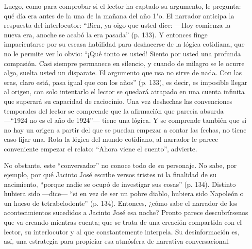 \documentclass[14pt,twoside,final]{extbook} %
\begin{document}
Luego, como para comprobar si el lector ha captado su argumento, le pregunta: qué día era antes de la una de la mañana del año 1"o. El narrador anticipa la respuesta del interlocutor: ``Bien, ya oigo que usted dice: ---Hoy comienza la nueva era, anoche se acabó la era pasada'' (p. 133). Y entonces finge impacientarse por su escasa habilidad para deshacerse de la lógica cotidiana, que no le permite ver lo obvio: ``¡Qué tonto es usted! Siento por usted una profunda compasión. Casi siempre permanece en silencio, y cuando de milagro se le ocurre algo, suelta usted un disparate. El argumento que usa no sirve de nada. Con las eras, claro está, pasa igual que con los años'' (p. 133), es decir, es imposible llegar al origen, con solo intentarlo el lector se quedará atrapado en una cuenta infinita que superará su capacidad de raciocinio. Una vez deshechas las convenciones temporales del lector se comprende que la afirmación que parecía absurda ---``1924 no es el año de 1924''--- tiene una lógica. Y se comprende también que si no hay un origen a partir del que se puedan empezar a contar las fechas, no tiene caso fijar una. Rota la lógica del mundo cotidiano, al narrador le parece conveniente empezar el relato: ``Ahora viene el cuento'', advierte.

No obstante, este ``conversador'' no conoce todo de su personaje. No sabe, por ejemplo, por qué Jacinto José escribe versos tristes ni la finalidad de su nacimiento, ``porque nadie se ocupó de investigar sus cosas'' (p. 134). Distinto hubiera sido ---dice--- ``si en vez de ser un pobre diablo, hubiera sido Napoleón o un hueso de tetrabelodonte'' (p. 134). Entonces, ¿cómo sabe el narrador de los acontecimientos sucedidos a Jacinto José esa noche? Pronto parece descubrírsenos que va creando mientras cuenta; que se trata de una creación compartida con el lector, su interlocutor y al que constantemente interpela. Su desinformación es, así, una estrategia para propiciar esa atmósfera de narrativa conversacional.
\end{document}

